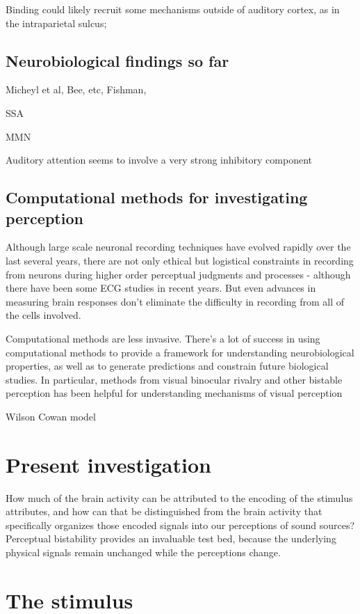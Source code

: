 Binding could likely recruit some mechanisms outside of auditory cortex, as in the intraparietal sulcus; \cite{Carlyon2001}
\subsection{Neurobiological findings so far}
Micheyl et al, Bee, etc, Fishman, 

SSA

MMN

Auditory attention seems to involve a very strong inhibitory component


\subsection{Computational methods for investigating perception}

Although large scale neuronal recording techniques have evolved rapidly over the last several years, there are not only ethical but logistical constraints in recording from neurons during higher order perceptual judgments and processes - although there have been some ECG studies in recent years. But even advances in measuring brain responses don't eliminate the difficulty in recording from all of the cells involved.

Computational methods are less invasive. There's a lot of success in using computational methods to provide a framework for understanding neurobiological properties, as well as to generate predictions and constrain future biological studies. In particular, methods from visual binocular rivalry and other bistable perception has been helpful for understanding mechanisms of visual perception 

Wilson Cowan model



\section{Present investigation}

How much of the brain activity can be attributed to the encoding of the stimulus attributes, and how can that be distinguished from the brain activity that specifically organizes those encoded signals into our perceptions of sound sources? Perceptual bistability provides an invaluable test bed, because the underlying physical signals remain unchanged while the perceptions change. 
\section{The stimulus}


